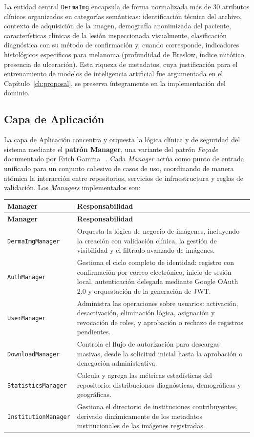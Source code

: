 La entidad central \texttt{DermaImg} encapsula de forma normalizada más de 30 atributos clínicos 
organizados en categorías semánticas: identificación técnica del archivo, contexto de adquisición de 
la imagen, demografía anonimizada del paciente, características clínicas de la lesión inspeccionada 
visualmente, clasificación diagnóstica con su método de confirmación y, cuando corresponde, indicadores 
histológicos específicos para melanoma (profundidad de Breslow, índice mitótico, presencia de ulceración). 
Esta riqueza de metadatos, cuya justificación para el entrenamiento de modelos de inteligencia artificial 
fue argumentada en el Capítulo~\ref{ch:proposal}, se preserva íntegramente en la implementación del 
dominio.

\subsection{Capa de Aplicación}
La capa de Aplicación concentra y orquesta la lógica clínica y de seguridad del sistema mediante 
el \textbf{patrón Manager}, una variante del patrón \textit{Façade} documentado por Erich Gamma ~\cite{gamma_design_patterns}.
Cada \textit{Manager} actúa como punto de entrada unificado 
para un conjunto cohesivo de casos de uso, coordinando de manera atómica la interacción entre 
repositorios, servicios de infraestructura y reglas de validación. Los \textit{Managers} implementados son:

\begin{longtable}{|p{4cm}|p{10.5cm}|}
\hline
\textbf{Manager} & \textbf{Responsabilidad} \\
\hline
\endfirsthead
\hline
\textbf{Manager} & \textbf{Responsabilidad} \\
\hline
\endhead
\texttt{DermaImgManager} & Orquesta la lógica de negocio de imágenes, incluyendo la creación con validación 
clínica, la gestión de visibilidad y el filtrado avanzado de imágenes. \\
\hline
\texttt{AuthManager} & Gestiona el ciclo completo de identidad: registro con confirmación por correo 
electrónico, inicio de sesión local, autenticación delegada mediante Google OAuth 2.0 y orquestación 
de la generación de JWT. \\
\hline
\texttt{UserManager} & Administra las operaciones sobre usuarios: activación, desactivación, eliminación 
lógica, asignación y revocación de roles, y aprobación o rechazo de registros pendientes. \\
\hline
\texttt{DownloadManager} & Controla el flujo de autorización para descargas masivas, desde la solicitud 
inicial hasta la aprobación o denegación administrativa. \\
\hline
\texttt{StatisticsManager} & Calcula y agrega las métricas estadísticas del repositorio: distribuciones 
diagnósticas, demográficas y geográficas. \\
\hline
\texttt{InstitutionManager} & Gestiona el directorio de instituciones contribuyentes, derivado dinámicamente 
de los metadatos institucionales de las imágenes registradas. \\
\hline
\end{longtable}

